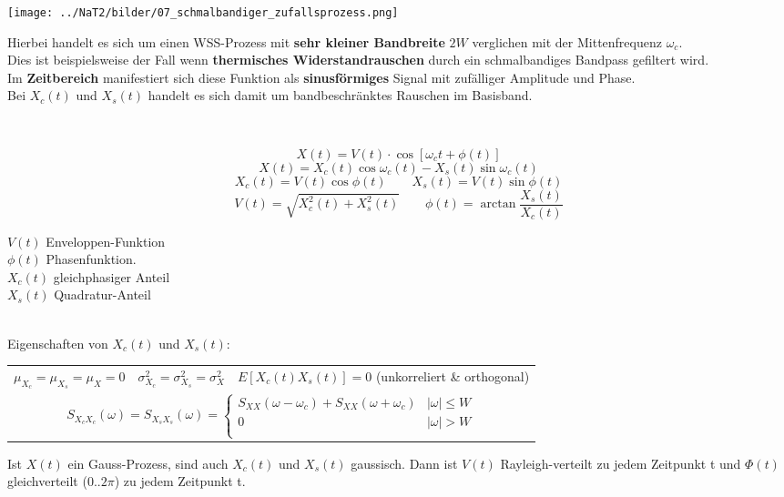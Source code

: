 \label{schmalbandiger_zufallsprozess}
	\begin{minipage}{9.5cm}
		\texttt{[image: ../NaT2/bilder/07\_schmalbandiger\_zufallsprozess.png]}
  	\end{minipage}
	\begin{minipage}{8.8cm}
		Hierbei handelt es sich um einen WSS-Prozess mit \textbf{sehr kleiner Bandbreite} $2W$ verglichen mit der
		Mittenfrequenz $\omega_c$. \\
		Dies ist beispielsweise der Fall wenn \textbf{thermisches Widerstandrauschen} durch ein schmalbandiges
		Bandpass gefiltert wird. \\
		Im \textbf{Zeitbereich} manifestiert sich diese Funktion als \textbf{sinusförmiges} Signal mit
		zufälliger Amplitude und Phase. \\
		Bei $X_{c}(t)$ und $X_{s}(t)$ handelt es sich damit um bandbeschr\"anktes Rauschen im Basisband.
  	\end{minipage} \\
	\begin{minipage}{10cm}
		\boldmath$$X(t) = V(t) \cdot \cos \left[ \omega_{c}t + \phi(t) \right]$$ \unboldmath
		$$X(t) = X_{c}(t)\cos\omega_{c}(t) - X_{s}(t)\sin\omega_{c}(t)$$
		$$X_{c}(t) = V(t)\cos\phi(t) \qquad X_{s}(t) = V(t)\sin\phi(t)$$
		$$V(t) = \sqrt{X^{2}_{c}(t) + X^{2}_{s}(t)} \qquad \phi(t) = \arctan \frac{X_{s}(t)}{X_{c}(t)}$$
  	\end{minipage}
	\begin{minipage}{8cm}
		$V(t)$ Enveloppen-Funktion \\ 
        $\phi(t)$ Phasenfunktion. \\
		$X_{c}(t)$ gleichphasiger Anteil \\ 
        $X_{s}(t)$ Quadratur-Anteil        
  	\end{minipage} \\

Eigenschaften von $X_{c}(t)$ und $X_{s}(t)$: \\

\renewcommand{\arraystretch}{1.5}
\begin{tabular}{p{4.5cm} p{4.5cm} p{9cm}}
	$\mu_{X_{c}} = \mu_{X_{s}} = \mu_{X} = 0$
		& $\sigma^{2}_{X_{c}} = \sigma^{2}_{X_{s}} = \sigma^{2}_{X}$
		& $E\left[ X_{c}(t)X_{s}(t) \right]  = 0$ (unkorreliert \& orthogonal) \\
	\multicolumn{3}{c}{$S_{X_{c}X_{c}}(\omega) = S_{X_{s}X_{s}}(\omega)
                   = \left\lbrace
                       \begin{array}{ll}
                         S_{XX}(\omega -\omega_{c}) +S_{XX}(\omega +\omega_{c})
                                        & \mid\!\omega\!\mid \leq W \\
                         0              & \mid\!\omega\!\mid > W \\
                       \end{array} \right. $} \\ 
\end{tabular}
\renewcommand{\arraystretch}{1}

Ist $X(t)$ ein Gauss-Prozess, sind auch $X_{c}(t)$ und $X_{s}(t)$ gaussisch. Dann ist $V(t)$
Rayleigh-verteilt zu jedem Zeitpunkt t und $\Phi(t)$ gleichverteilt ($0..2\pi$) zu jedem
Zeitpunkt t. 
